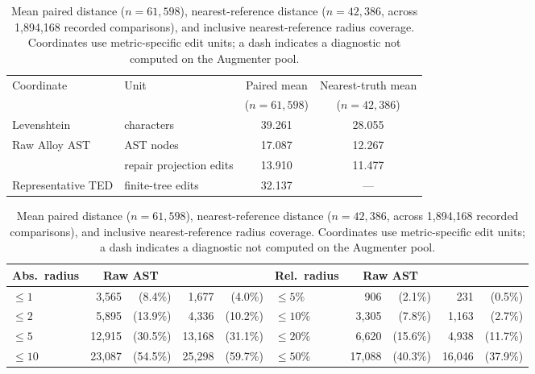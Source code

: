 \begin{table}[H]
\centering
\caption{Mean paired distance ($n=61{,}598$), nearest-reference distance
($n=42{,}386$, across 1,894,168 recorded comparisons), and inclusive
nearest-reference radius coverage. Coordinates use metric-specific edit units;
a dash indicates a diagnostic not computed on the Augmenter pool.}
\label{tab:distance-summary}
\scriptsize
\setlength{\tabcolsep}{3.5pt}
\begin{tabular}{@{}llcc@{}}
\toprule
Coordinate & Unit & Paired mean & Nearest-truth mean\\
& & ($n=61{,}598$) & ($n=42{,}386$)\\
\midrule
Levenshtein & characters & 39.261 & 28.055\\
Raw Alloy AST & AST nodes & 17.087 & 12.267\\
\CanDis{} & repair projection edits & 13.910 & 11.477\\
Representative TED & finite-tree edits & 32.137 & ---\\
\bottomrule
\end{tabular}

\medskip
\begin{tabular}{@{}lrrrr|lrrrr@{}}
\toprule
Abs.\ radius & \multicolumn{2}{c}{Raw AST} & \multicolumn{2}{c|}{\CanDis{}} &
Rel.\ radius & \multicolumn{2}{c}{Raw AST} & \multicolumn{2}{c}{\CanDis{}}\\
\midrule
$\le 1$ & 3,565 & (8.4\%) & 1,677 & (4.0\%) & $\le 5\%$ & 906 & (2.1\%) & 231 & (0.5\%)\\
$\le 2$ & 5,895 & (13.9\%) & 4,336 & (10.2\%) & $\le 10\%$ & 3,305 & (7.8\%) & 1,163 & (2.7\%)\\
$\le 5$ & 12,915 & (30.5\%) & 13,168 & (31.1\%) & $\le 20\%$ & 6,620 & (15.6\%) & 4,938 & (11.7\%)\\
$\le 10$ & 23,087 & (54.5\%) & 25,298 & (59.7\%) & $\le 50\%$ & 17,088 & (40.3\%) & 16,046 & (37.9\%)\\
\bottomrule
\end{tabular}
\end{table}
